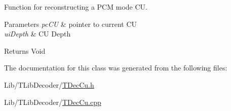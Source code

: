 Function for reconstructing a P\+CM mode CU. 
\begin{DoxyParams}{Parameters}
{\em pc\+CU} & pointer to current CU \\
\hline
{\em ui\+Depth} & CU Depth \\
\hline
\end{DoxyParams}
\begin{DoxyReturn}{Returns}
Void 
\end{DoxyReturn}


The documentation for this class was generated from the following files\+:\begin{DoxyCompactItemize}
\item 
Lib/\+T\+Lib\+Decoder/\hyperlink{_t_dec_cu_8h}{T\+Dec\+Cu.\+h}\item 
Lib/\+T\+Lib\+Decoder/\hyperlink{_t_dec_cu_8cpp}{T\+Dec\+Cu.\+cpp}\end{DoxyCompactItemize}

